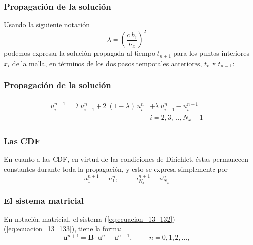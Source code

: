 \begin{frame}
\frametitle{Propagación de la solución}
Usando la siguiente notación
\begin{equation}
\lambda = \left( \dfrac{c \: h_{t}}{h_{x}} \right)^{2}
\label{eq:ecuacion_13_131}
\end{equation}
podemos expresar la solución propagada al tiempo $t_{n+1}$ para los puntos interiores $x_{i}$ de la malla, en términos de los dos pasos temporales anteriores, $t_{n}$ y $t_{n-1}$:
\end{frame}
\begin{frame}
\frametitle{Propagación de la solución}
\begin{align}
\begin{aligned}
u_{i}^{n+1} = \lambda \: u_{i-1}^{n} + 2 \: (1 - \lambda) \: u_{i}^{n} &+ \lambda \: u_{i+1}^{n} - u_{i}^{n-1} \\
& i = 2, 3, \ldots, N_{x} - 1
\end{aligned}
\label{eq:ecuacion_13_132}
\end{align}
\end{frame}
\begin{frame}
\frametitle{Las CDF}
En cuanto a las CDF, en virtud de las condiciones de Dirichlet, éstas permanecen constantes durante toda la propagación, y esto se expresa simplemente por 
\begin{equation}
u_{1}^{n+1} = u_{1}^{n}, \hspace{1cm} u_{N_{x}}^{n+1} = u_{N_{x}}^{n}
\label{eq:ecuacion_13_133}
\end{equation}
\end{frame}
\begin{frame}
\frametitle{El sistema matricial}
En notación matricial, el sistema (\ref{eq:ecuacion_13_132}) - (\ref{eq:ecuacion_13_133}), tiene la forma:
\begin{equation}
\mathbf{u}^{n+1} =  \mathbf{B} \cdot \mathbf{u}^{n} - \mathbf{u}^{n-1}, \hspace{1cm} n = 0, 1, 2, \ldots,
\label{eq:ecuacion_13_134}
\end{equation}
\end{frame}
